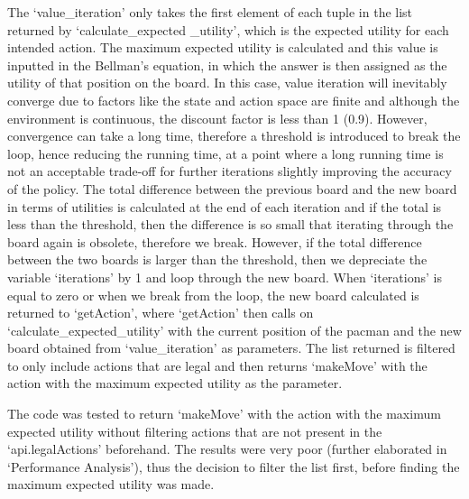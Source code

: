 \documentclass[12pt]{report}
\begin{document}
        The `value\_iteration' only takes the first element of each tuple in the list returned by `calculate\_expected \_utility', which is the expected utility for each intended action. The maximum expected utility is calculated and this value is inputted in the Bellman's equation, in which the answer is then assigned as the utility of that position on the board.
        \newline \newline
        In this case, value iteration will inevitably converge due to factors like the state and action space are finite and although the environment is continuous, the discount factor is less than 1 (0.9). However, convergence can take a long time, therefore a threshold is introduced to break the loop, hence reducing the running time, at a point where a long running time is not an acceptable trade-off for further iterations slightly improving the accuracy of the policy.
        \newline \newline
        The total difference between the previous board and the new board in terms of utilities is calculated at the end of each iteration and if the total is less than the threshold, then the difference is so small that iterating through the board again is obsolete, therefore we break. However, if the total difference between the two boards is larger than the threshold, then we depreciate the variable `iterations' by 1 and loop through the new board. When `iterations' is equal to zero or when we break from the loop, the new board calculated is returned to `getAction', where `getAction' then calls on `calculate\_expected\_utility' with the current position of the pacman and the new board obtained from `value\_iteration' as parameters. The list returned is filtered to only include actions that are legal and then returns `makeMove' with the action with the maximum expected utility as the parameter.

        The code was tested to return `makeMove' with the action with the maximum expected utility without filtering actions that are not present in the `api.legalActions' beforehand. The results were very poor (further elaborated in `Performance Analysis'), thus the decision to filter the list first, before finding the maximum expected utility was made.
\end{document}
